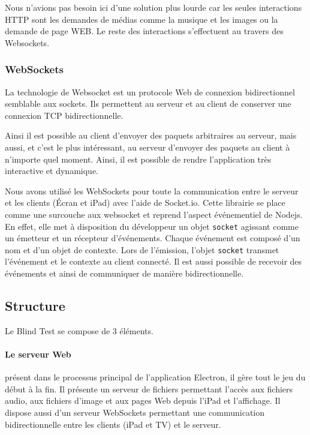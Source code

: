 Nous n'avions pas besoin ici d'une solution plus lourde car les seules interactions HTTP sont les demandes de médias comme la musique et les images ou la demande de page WEB.
Le reste des interactions s'effectuent au travers des Websockets.

\subsubsection{WebSockets}

La technologie de Websocket est un protocole Web de connexion bidirectionnel semblable aux sockets.
Ils permettent au serveur et au client de conserver une connexion TCP bidirectionnelle.

Ainsi il est possible au client d'envoyer des paquets arbitraires au serveur, mais aussi, et c'est le plus intéressant, au serveur d'envoyer des paquets au client à n'importe quel moment.
Ainsi, il est possible de rendre l'application très interactive et dynamique.

Nous avons utilisé les WebSockets pour toute la communication entre le serveur et les clients (Écran et iPad) avec l'aide de Socket.io.
Cette librairie se place comme une surcouche aux websocket et reprend l'aspect événementiel de Nodejs.
En effet, elle met à disposition du développeur un objet \texttt{socket} agissant comme un émetteur et un récepteur d'événements.
Chaque événement est composé d'un nom et d'un objet de contexte.
Lors de l'émission, l'objet \texttt{socket} transmet l'événement et le contexte au client connecté.
Il est aussi possible de recevoir des événements et ainsi de communiquer de manière bidirectionnelle.

\subsection{Structure}

Le Blind Test se compose de 3 éléments.

\paragraph{Le serveur Web} présent dans le processus principal de l'application Electron, il gère tout le jeu du début à la fin.
Il présente un serveur de fichiers permettant l'accès aux fichiers audio, aux fichiers d'image et aux pages Web depuis l'iPad et l'affichage.
Il dispose aussi d'un serveur WebSockets permettant une communication bidirectionnelle entre les clients (iPad et TV) et le serveur.

